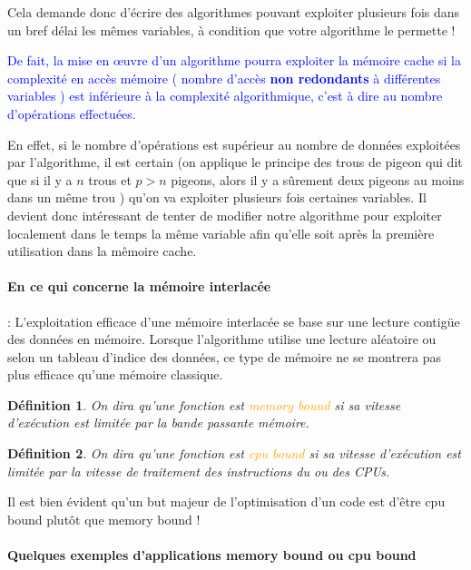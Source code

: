 \documentclass[fleqn,11pt]{article}
\newtheorem{definition}{Définition }
\begin{document}
Cela demande donc d'écrire des algorithmes pouvant exploiter plusieurs fois dans un bref délai les mêmes variables, à condition que votre algorithme le permette !

\textcolor{blue}{De fait, la mise en {\oe}uvre d'un algorithme pourra exploiter la mémoire cache si la complexité en accès mémoire ( nombre d'accès \textbf{non redondants} à différentes variables ) 
est inférieure à la complexité algorithmique, c'est à dire au nombre d'opérations effectuées.}

En effet, si le nombre d'opérations est supérieur au nombre de données exploitées par l'algorithme,
il est certain (on applique le principe des trous de pigeon qui dit que si il y a $n$ trous
et $p>n$ pigeons, alors il y a sûrement deux pigeons au moins dans un même trou ) qu'on va exploiter plusieurs
fois certaines variables. Il devient donc intéressant de tenter de modifier notre algorithme pour exploiter
localement dans le temps la même variable afin qu'elle soit après la première utilisation dans la
mêmoire cache.

\paragraph{En ce qui concerne la mémoire interlacée} : L'exploitation efficace d'une mémoire interlacée se base sur une lecture contigüe des données en mémoire. Lorsque l'algorithme utilise une lecture aléatoire ou selon un tableau d'indice des données, ce type de mémoire ne se montrera pas plus efficace qu'une mémoire classique.


\begin{definition}
On dira qu'une fonction est \textcolor{orange}{memory bound} si sa vitesse d'exécution est limitée par la bande passante mémoire.
\end{definition}

\begin{definition}
On dira qu'une fonction est \textcolor{orange}{cpu bound} si sa vitesse d'exécution est limitée par la vitesse de traitement des instructions du ou des CPUs.
\end{definition}

Il est bien évident qu'un but majeur de l'optimisation d'un code est d'être cpu bound plutôt que memory bound !

\paragraph{Quelques exemples d'applications memory bound ou cpu bound}
\end{document}
